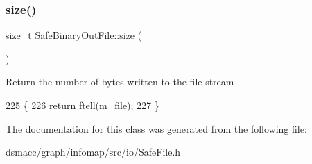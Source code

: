 \subsubsection{\texorpdfstring{size()}{size()}}
{\footnotesize\ttfamily size\+\_\+t Safe\+Binary\+Out\+File\+::size (\begin{DoxyParamCaption}{ }\end{DoxyParamCaption})\hspace{0.3cm}{\ttfamily [inline]}}

Return the number of bytes written to the file stream 
\begin{DoxyCode}
225     \{
226         \textcolor{keywordflow}{return} ftell(m\_file);
227     \}
\end{DoxyCode}


The documentation for this class was generated from the following file\+:\begin{DoxyCompactItemize}
\item 
dsmacc/graph/infomap/src/io/Safe\+File.\+h\end{DoxyCompactItemize}
